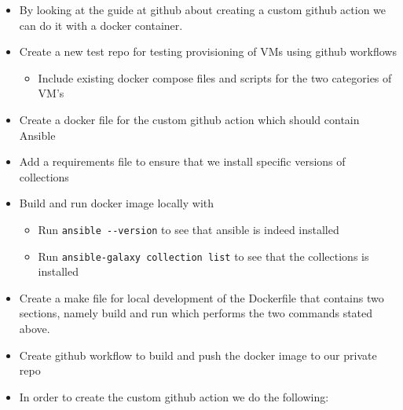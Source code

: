 \begin{itemize}
\item By looking at the guide at github about creating a custom github action we can do it with a docker container.
\item Create a new test repo for testing provisioning of VMs using github workflows

    \begin{itemize}
        \item Include existing docker compose files and scripts for the two categories of VM's
    \end{itemize}
    \item Create a docker file for the custom github action which should contain Ansible
    \item Add a requirements file to ensure that we install specific versions of collections
    \item Build and run docker image locally with


    \begin{itemize}
        \item Run \texttt{ansible\ -\/-version} to see that ansible is indeed installed
        \item Run \texttt{ansible-galaxy\ collection\ list} to see that the collections is installed
    \end{itemize}
    \item Create a make file for local development of the Dockerfile that contains two sections, namely build and run which performs the two commands stated above.
    \item Create github workflow to build and push the docker image to our private repo
    \item In order to create the custom github action we do the following:


\end{itemize}
